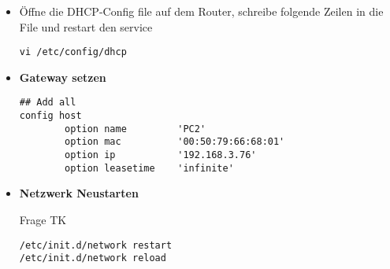 \begin{itemize}
\item Öffne die DHCP-Config file auf dem Router, schreibe folgende Zeilen in die File und restart den service
\begin{verbatim}
vi /etc/config/dhcp
\end{verbatim}

\item \textbf{Gateway setzen}
\begin{verbatim}
## Add all
config host
        option name			'PC2'
        option mac			'00:50:79:66:68:01'
        option ip			'192.168.3.76'
        option leasetime 	'infinite'
\end{verbatim}

\item \textbf{Netzwerk Neustarten}
\begin{Huge} Frage TK \end{Huge}
\begin{verbatim}
/etc/init.d/network restart
/etc/init.d/network reload
\end{verbatim}
\end{itemize}
